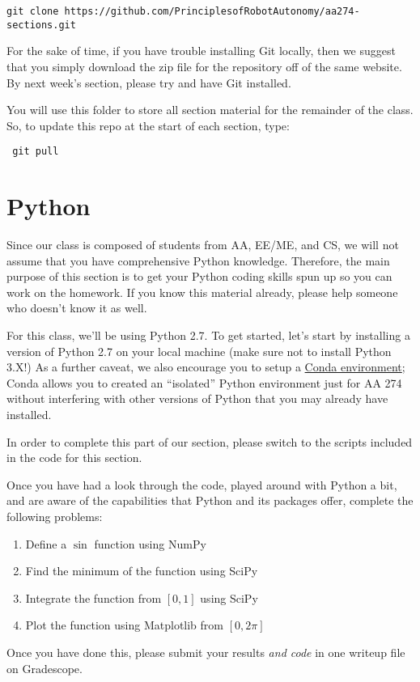 \documentclass{article}
\begin{document}
 \begin{lstlisting}[escapechar=|]
 git clone https://github.com/PrinciplesofRobotAutonomy/aa274-sections.git
\end{lstlisting}
For the sake of time, if you have trouble installing Git locally, then we suggest that you simply download the zip file for the repository off of the same website. By next week's section, please try and have Git installed.

You will use this folder to store all section material for the remainder of the class. So, to update this repo at the start of each section, type: 

 \begin{lstlisting}
 git pull
\end{lstlisting}


\section{Python}
Since our class is composed of students from AA, EE/ME, and CS, we will not assume that you have comprehensive Python knowledge. Therefore, the main purpose of this section is to get your Python coding skills spun up so you can work on the homework. If you know this material already, please help someone who doesn't know it as well.

For this class, we'll be using Python 2.7. To get started, let's start by installing a version of Python 2.7 on your local machine (make sure not to install Python 3.X!) As a further caveat, we also encourage you to setup a \href{https://docs.conda.io/projects/conda/en/latest/user-guide/tasks/manage-environments.html}{Conda environment}; Conda allows you to created an ``isolated'' Python environment just for AA 274 without interfering with other versions of Python that you may already have installed.

In order to complete this part of our section, please switch to the scripts included in the code for this section.


Once you have had a look through the code, played around with Python a bit, and are aware of the capabilities that Python and its packages offer, complete the following problems:
{\bf
\begin{enumerate}
\item Define a $\sin$ function using NumPy
\item Find the minimum of the function using SciPy
\item Integrate the function from $[0, 1]$ using SciPy
\item Plot the function using Matplotlib from $[0, 2\pi]$
\end{enumerate}
}
Once you have done this, please submit your results \textit{and code} in one writeup file on Gradescope.
\end{document}
